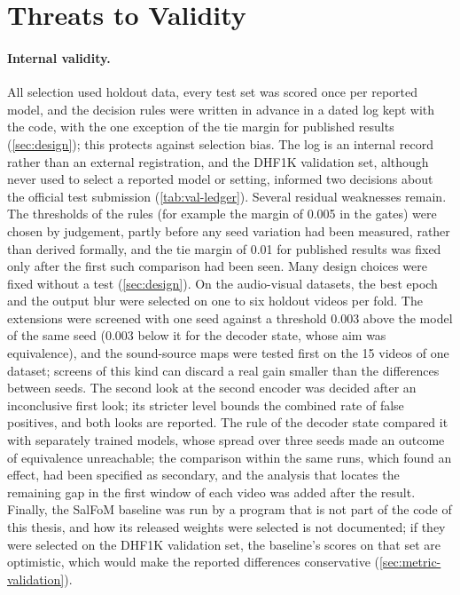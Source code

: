 \section{Threats to Validity}\label{sec:threats}

\paragraph{Internal validity.} All selection used holdout data, every test set
was scored once per reported model, and the decision rules were written in
advance in a dated log kept with the code, with the one exception of the tie
margin for published results (\cref{sec:design}); this protects against
selection bias. The log is an internal record rather than an external
registration, and the DHF1K validation set, although never used to select a
reported model or setting, informed two decisions about the official test
submission (\cref{tab:val-ledger}). Several residual weaknesses remain. The
thresholds of the rules (for example the margin of 0.005 in the gates) were
chosen by judgement, partly before any seed variation had been measured, rather
than derived formally, and the tie margin of 0.01 for published results was
fixed only after the first such comparison had been seen. Many design choices
were fixed without a test (\cref{sec:design}). On the audio-visual datasets, the
best epoch and the output blur were selected on one to six holdout videos per
fold. The extensions were screened with one seed against a threshold 0.003
above the model of the same seed (0.003 below it for the decoder state, whose
aim was equivalence), and the sound-source maps were tested first
on the 15 videos of one dataset; screens of this kind can discard a real gain
smaller than the differences between seeds. The second look at the second
encoder was decided after an inconclusive first look; its stricter level bounds
the combined rate of false positives, and both looks are reported. The rule of
the decoder state compared it with separately trained models, whose spread over
three seeds made an outcome of equivalence unreachable; the comparison within
the same runs, which found an effect, had been specified as secondary, and the
analysis that locates the remaining gap in the first window of each video was
added after the result. Finally, the SalFoM baseline was run by a program that is not part of the
code of this thesis, and how its released weights were selected is not
documented; if they were selected on the DHF1K validation set, the baseline's
scores on that set are optimistic, which would make the reported differences
conservative (\cref{sec:metric-validation}).

